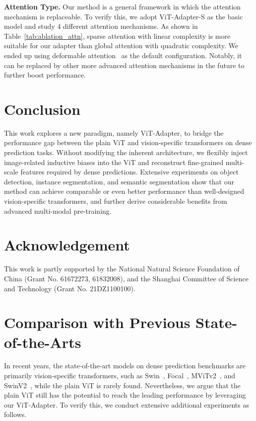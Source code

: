 \documentclass{article} \usepackage{iclr2023_conference,times}
\begin{document}
\noindent \textbf{Attention Type.}
Our method is a general framework in which the attention mechanism is replaceable.
To verify this, we adopt ViT-Adapter-S as the basic model and study 4 different attention mechanisms.
As shown in Table~\ref{tab:ablation_attn}, sparse attention with linear complexity is more suitable for our adapter than global attention with quadratic complexity. 
We ended up using deformable attention~\citep{zhu2020deformable} as the default configuration.
Notably, it can be replaced by other more advanced attention mechanisms in the future to further boost performance.






\section{Conclusion}
This work explores a new paradigm, namely ViT-Adapter, to bridge the performance gap between the plain ViT and vision-specific transformers on dense prediction tasks.
Without modifying the inherent architecture, we flexibly inject image-related inductive biases into the ViT and reconstruct fine-grained multi-scale features required by dense predictions.
Extensive experiments on object detection, instance segmentation, and semantic segmentation show that our method can achieve comparable or even better performance than well-designed vision-specific transformers, and further derive considerable benefits from advanced multi-modal pre-training.

\section*{Acknowledgement}
This work is partly supported by the National Natural Science Foundation of China (Grant No. 61672273, 61832008), and the Shanghai Committee of Science and Technology (Grant No. 21DZ1100100).




\newpage

\appendix
\section{Comparison with Previous State-of-the-Arts}

In recent years, the state-of-the-art models on dense prediction benchmarks are primarily vision-specific transformers, such as Swin~\citep{liu2021swin}, Focal~\citep{yang2021focal}, MViTv2~\citep{li2021improved}, and SwinV2~\citep{liu2021swinv2}, while the plain ViT is rarely found.
Nevertheless, we argue that the plain ViT still has the potential to reach the leading performance by leveraging our ViT-Adapter.
To verify this, we conduct extensive additional experiments as follows.
\end{document}
